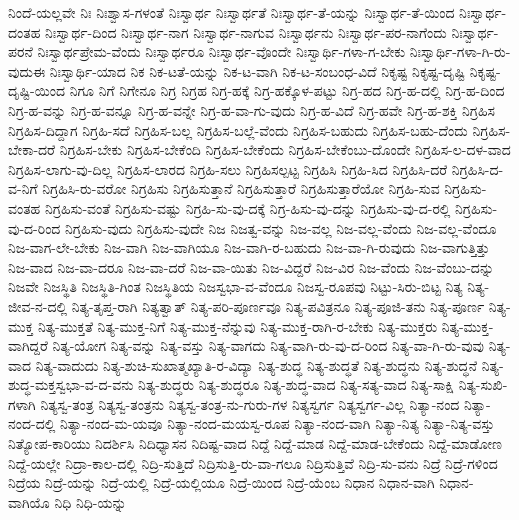 {ನಿಂದೆ-ಯಲ್ಲವೇ
ನಿಃ
ನಿಃಶ್ವಾಸ-ಗಳಂತೆ
ನಿಃಸ್ವಾರ್ಥ
ನಿಃಸ್ವಾರ್ಥತೆ
ನಿಃಸ್ವಾರ್ಥ-ತೆ-ಯನ್ನು
ನಿಃಸ್ವಾರ್ಥ-ತೆ-ಯಿಂದ
ನಿಃಸ್ವಾರ್ಥ-ದಂತಹ
ನಿಃಸ್ವಾರ್ಥ-ದಿಂದ
ನಿಃಸ್ವಾರ್ಥ-ನಾಗ
ನಿಃಸ್ವಾರ್ಥ-ನಾಗುವ
ನಿಃಸ್ವಾರ್ಥನು
ನಿಃಸ್ವಾರ್ಥ-ಪರ-ನಾಗೆಂದು
ನಿಃಸ್ವಾರ್ಥ-ಪರನೆ
ನಿಃಸ್ವಾರ್ಥಪ್ರೇಮ-ವೆಂದು
ನಿಃಸ್ವಾರ್ಥರೂ
ನಿಃಸ್ವಾರ್ಥ-ವೊಂದೇ
ನಿಃಸ್ವಾರ್ಥಿ-ಗಳಾ-ಗ-ಬೇಕು
ನಿಃಸ್ವಾರ್ಥಿ-ಗಳಾ-ಗಿ-ರು-ವುದುಈ
ನಿಃಸ್ವಾರ್ಥಿ-ಯಾದ
ನಿಕ
ನಿಕ-ಟತೆ-ಯನ್ನು
ನಿಕ-ಟ-ವಾಗಿ
ನಿಕ-ಟ-ಸಂಬಂಧ-ವಿದೆ
ನಿಕೃಷ್ಟ
ನಿಕೃಷ್ಟ-ದೃಷ್ಟಿ
ನಿಕೃಷ್ಟ-ದೃಷ್ಟಿ-ಯಿಂದ
ನಿಗೂ
ನಿಗೆ
ನಿಗೇನೂ
ನಿಗ್ರ
ನಿಗ್ರಹ
ನಿಗ್ರ-ಹಕ್ಕೆ
ನಿಗ್ರ-ಹಕ್ಕೊಳ-ಪಟ್ಟು
ನಿಗ್ರ-ಹದ
ನಿಗ್ರ-ಹ-ದಲ್ಲಿ
ನಿಗ್ರ-ಹ-ದಿಂದ
ನಿಗ್ರ-ಹ-ವನ್ನು
ನಿಗ್ರ-ಹ-ವನ್ನೂ
ನಿಗ್ರ-ಹ-ವನ್ನೇ
ನಿಗ್ರ-ಹ-ವಾ-ಗು-ವುದು
ನಿಗ್ರ-ಹ-ವಿದೆ
ನಿಗ್ರ-ಹವೇ
ನಿಗ್ರ-ಹ-ಶಕ್ತಿ
ನಿಗ್ರಹಿಸ
ನಿಗ್ರಹಿಸ-ದಿದ್ದಾಗ
ನಿಗ್ರಹಿ-ಸದೆ
ನಿಗ್ರಹಿಸ-ಬಲ್ಲ
ನಿಗ್ರಹಿಸ-ಬಲ್ಲೆ-ವೆಂದು
ನಿಗ್ರಹಿಸ-ಬಹುದು
ನಿಗ್ರಹಿಸ-ಬಹು-ದೆಂದು
ನಿಗ್ರಹಿಸ-ಬೇಕಾ-ದರೆ
ನಿಗ್ರಹಿಸ-ಬೇಕು
ನಿಗ್ರಹಿಸ-ಬೇಕೆಂದಿ
ನಿಗ್ರಹಿಸ-ಬೇಕೆಂದು
ನಿಗ್ರಹಿಸ-ಬೇಕೆಂಬು-ದೊಂದೇ
ನಿಗ್ರಹಿಸ-ಲ-ದಳ-ವಾದ
ನಿಗ್ರಹಿಸ-ಲಾಗು-ವು-ದಿಲ್ಲ
ನಿಗ್ರಹಿಸ-ಲಾರದ
ನಿಗ್ರಹಿ-ಸಲು
ನಿಗ್ರಹಿಸಲ್ಪಟ್ಟ
ನಿಗ್ರಹಿಸಿ
ನಿಗ್ರಹಿ-ಸಿದ
ನಿಗ್ರಹಿಸಿ-ದರೆ
ನಿಗ್ರಹಿಸಿ-ದ-ವ-ನಿಗೆ
ನಿಗ್ರಹಿಸಿ-ರು-ವರೋ
ನಿಗ್ರಹಿಸು
ನಿಗ್ರಹಿಸುತ್ತಾನೆ
ನಿಗ್ರಹಿಸುತ್ತಾರೆ
ನಿಗ್ರಹಿಸುತ್ತಾರೆಯೋ
ನಿಗ್ರಹಿ-ಸುವ
ನಿಗ್ರಹಿಸು-ವಂತಹ
ನಿಗ್ರಹಿಸು-ವಂತೆ
ನಿಗ್ರಹಿಸು-ವಷ್ಟು
ನಿಗ್ರಹಿ-ಸು-ವು-ದಕ್ಕೆ
ನಿಗ್ರ-ಹಿಸು-ವು-ದನ್ನು
ನಿಗ್ರಹಿಸು-ವು-ದ-ರಲ್ಲಿ
ನಿಗ್ರಹಿಸು-ವು-ದ-ರಿಂದ
ನಿಗ್ರಹಿಸು-ವುದು
ನಿಗ್ರಹಿಸು-ವುದೇ
ನಿಜ
ನಿಜತ್ವ-ವನ್ನು
ನಿಜ-ವಲ್ಲ
ನಿಜ-ವಲ್ಲ-ವೆಂದು
ನಿಜ-ವಲ್ಲ-ವೆಂದೂ
ನಿಜ-ವಾಗ-ಲೇ-ಬೇಕು
ನಿಜ-ವಾಗಿ
ನಿಜ-ವಾಗಿಯೂ
ನಿಜ-ವಾಗಿ-ರ-ಬಹುದು
ನಿಜ-ವಾ-ಗಿ-ರುವುದು
ನಿಜ-ವಾಗುತ್ತಿತ್ತು
ನಿಜ-ವಾದ
ನಿಜ-ವಾ-ದರೂ
ನಿಜ-ವಾ-ದರೆ
ನಿಜ-ವಾ-ಯಿತು
ನಿಜ-ವಿದ್ದರೆ
ನಿಜ-ವಿರ
ನಿಜ-ವೆಂದು
ನಿಜ-ವೆಂಬು-ದನ್ನು
ನಿಜವೇ
ನಿಜಸ್ಥಿತಿ
ನಿಜಸ್ಥಿತಿ-ಗಿಂತ
ನಿಜಸ್ಥಿತಿಯ
ನಿಜಸ್ವಭಾ-ವ-ವೆಂದೂ
ನಿಜಸ್ವ-ರೂಪವು
ನಿಟ್ಟು-ಸಿರು-ಬಿಟ್ಟ
ನಿತ್ಯ
ನಿತ್ಯ-ಜೀವ-ನ-ದಲ್ಲಿ
ನಿತ್ಯ-ತೃಪ್ತ-ರಾಗಿ
ನಿತ್ಯತ್ವಾತ್
ನಿತ್ಯ-ಪರಿ-ಪೂರ್ಣವೂ
ನಿತ್ಯ-ಪವಿತ್ರನೂ
ನಿತ್ಯ-ಪೂಜಿ-ತನು
ನಿತ್ಯ-ಪೂರ್ಣ
ನಿತ್ಯ-ಮುಕ್ತ
ನಿತ್ಯ-ಮುಕ್ತತೆ
ನಿತ್ಯ-ಮುಕ್ತ-ನಿಗೆ
ನಿತ್ಯ-ಮುಕ್ತ-ನೆನ್ನುವು
ನಿತ್ಯ-ಮುಕ್ತ-ರಾಗಿ-ರ-ಬೇಕು
ನಿತ್ಯ-ಮುಕ್ತರು
ನಿತ್ಯ-ಮುಕ್ತ-ವಾಗಿದ್ದರೆ
ನಿತ್ಯ-ಯೋಗ
ನಿತ್ಯ-ವನ್ನು
ನಿತ್ಯ-ವಸ್ತು
ನಿತ್ಯ-ವಾಗದು
ನಿತ್ಯ-ವಾಗಿ-ರು-ವು-ದ-ರಿಂದ
ನಿತ್ಯ-ವಾ-ಗಿ-ರು-ವುವು
ನಿತ್ಯ-ವಾದ
ನಿತ್ಯ-ವಾದುದು
ನಿತ್ಯ-ಶುಚಿ-ಸುಖಾತ್ಮಖ್ಯಾತಿ-ರ-ವಿದ್ಯಾ
ನಿತ್ಯ-ಶುದ್ಧ
ನಿತ್ಯ-ಶುದ್ಧತೆ
ನಿತ್ಯ-ಶುದ್ಧನು
ನಿತ್ಯ-ಶುದ್ಧನೆ
ನಿತ್ಯ-ಶುದ್ಧ-ಮಕ್ತಸ್ವಭಾ-ವ-ದ-ವನು
ನಿತ್ಯ-ಶುದ್ಧರು
ನಿತ್ಯ-ಶುದ್ಧರೂ
ನಿತ್ಯ-ಶುದ್ಧ-ವಾದ
ನಿತ್ಯ-ಸತ್ಯ-ವಾದ
ನಿತ್ಯ-ಸಾಕ್ಷಿ
ನಿತ್ಯ-ಸುಖಿ-ಗಳಾಗಿ
ನಿತ್ಯಸ್ವ-ತಂತ್ರ
ನಿತ್ಯಸ್ವ-ತಂತ್ರನು
ನಿತ್ಯಸ್ವ-ತಂತ್ರ-ನು-ಗುರು-ಗಳ
ನಿತ್ಯಸ್ವರ್ಗ
ನಿತ್ಯಸ್ವರ್ಗ-ವಿಲ್ಲ
ನಿತ್ಯಾ-ನಂದ
ನಿತ್ಯಾ-ನಂದ-ದಲ್ಲಿ
ನಿತ್ಯಾ-ನಂದ-ಮ-ಯವೂ
ನಿತ್ಯಾ-ನಂದ-ಮಯಸ್ವ-ರೂಪ
ನಿತ್ಯಾ-ನಂದ-ವಾಗಿ
ನಿತ್ಯಾ-ನಿತ್ಯ
ನಿತ್ಯಾ-ನಿತ್ಯ-ವಸ್ತು
ನಿತ್ಯೋಪ-ಕಾರಿಯು
ನಿದರ್ಶಿಸಿ
ನಿದಿಧ್ಯಾಸನ
ನಿದಿಷ್ಟ-ವಾದ
ನಿದ್ದೆ
ನಿದ್ದೆ-ಮಾಡ
ನಿದ್ದೆ-ಮಾಡ-ಬೇಕೆಂದು
ನಿದ್ದೆ-ಮಾಡೋಣ
ನಿದ್ದೆ-ಯಲ್ಲೇ
ನಿದ್ರಾ-ಕಾಲ-ದಲ್ಲಿ
ನಿದ್ರಿ-ಸುತ್ತಿದೆ
ನಿದ್ರಿಸುತ್ತಿ-ರು-ವಾ-ಗಲೂ
ನಿದ್ರಿಸುತ್ತಿವೆ
ನಿದ್ರಿ-ಸು-ವನು
ನಿದ್ರೆ
ನಿದ್ರೆ-ಗಳಿಂದ
ನಿದ್ರೆಯ
ನಿದ್ರೆ-ಯನ್ನು
ನಿದ್ರೆ-ಯಲ್ಲಿ
ನಿದ್ರೆ-ಯಲ್ಲಿಯೂ
ನಿದ್ರೆ-ಯಿಂದ
ನಿದ್ರೆ-ಯೆಂಬ
ನಿಧಾನ
ನಿಧಾನ-ವಾಗಿ
ನಿಧಾನ-ವಾಗಿಯೊ
ನಿಧಿ
ನಿಧಿ-ಯನ್ನು
}
